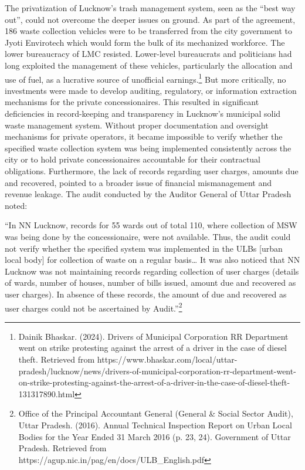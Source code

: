 The privatization of Lucknow's trash management system, seen as the ``best way out'', could not overcome the deeper issues on ground. As part of the agreement, 186 waste collection vehicles were to be transferred from the city government to Jyoti Envirotech which would form the bulk of its mechanized workforce. The lower bureaucracy of LMC resisted. Lower-level bureaucrats and politicians had long exploited the management of these vehicles, particularly the allocation and use of fuel, as a lucrative source of unofficial earnings.\footnote{Dainik Bhaskar. (2024). Drivers of Municipal Corporation RR Department went on strike protesting against the arrest of a driver in the case of diesel theft. Retrieved from https://www.bhaskar.com/local/uttar-pradesh/lucknow/news/drivers-of-municipal-corporation-rr-department-went-on-strike-protesting-against-the-arrest-of-a-driver-in-the-case-of-diesel-theft-131317890.html} But more critically, no investments were made to develop auditing, regulatory, or information extraction mechanisms for the private concessionaires. This resulted in significant deficiencies in record-keeping and transparency in Lucknow's municipal solid waste management system. Without proper documentation and oversight mechanisms for private operators, it became impossible to verify whether the specified waste collection system was being implemented consistently across the city or to hold private concessionaires accountable for their contractual obligations. Furthermore, the lack of records regarding user charges, amounts due and recovered, pointed to a broader issue of financial mismanagement and revenue leakage. The audit conducted by the Auditor General of Uttar Pradesh noted:

``In NN Lucknow, records for 55 wards out of total 110, where collection of MSW was being done by the concessionaire, were not available. Thus, the audit could not verify whether the specified system was implemented in the ULBs [urban local body] for collection of waste on a regular basis… It was also noticed that NN Lucknow was not maintaining records regarding collection of user charges (details of wards, number of houses, number of bills issued, amount due and recovered as user charges). In absence of these records, the amount of due and recovered as user charges could not be ascertained by Audit.''\footnote{Office of the Principal Accountant General (General \& Social Sector Audit), Uttar Pradesh. (2016). Annual Technical Inspection Report on Urban Local Bodies for the Year Ended 31 March 2016 (p. 23, 24). Government of Uttar Pradesh. Retrieved from https://agup.nic.in/pag/en/docs/ULB\_English.pdf}

